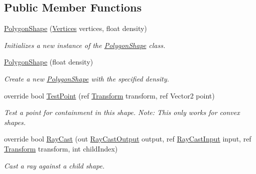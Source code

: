 \subsection*{Public Member Functions}
\begin{DoxyCompactItemize}
\item 
\hyperlink{class_farseer_physics_1_1_collision_1_1_shapes_1_1_polygon_shape_affa2db228b79a2a7d5a1f0c7f2ce8d9f}{Polygon\+Shape} (\hyperlink{class_farseer_physics_1_1_common_1_1_vertices}{Vertices} vertices, float density)
\begin{DoxyCompactList}\small\item\em Initializes a new instance of the \hyperlink{class_farseer_physics_1_1_collision_1_1_shapes_1_1_polygon_shape}{Polygon\+Shape} class. \end{DoxyCompactList}\item 
\hyperlink{class_farseer_physics_1_1_collision_1_1_shapes_1_1_polygon_shape_a1bac1381b29db8295932c02f9e76cf74}{Polygon\+Shape} (float density)
\begin{DoxyCompactList}\small\item\em Create a new \hyperlink{class_farseer_physics_1_1_collision_1_1_shapes_1_1_polygon_shape}{Polygon\+Shape} with the specified density. \end{DoxyCompactList}\item 
override bool \hyperlink{class_farseer_physics_1_1_collision_1_1_shapes_1_1_polygon_shape_ad09b14d386dc6fe310826e700b4a68db}{Test\+Point} (ref \hyperlink{struct_farseer_physics_1_1_common_1_1_transform}{Transform} transform, ref Vector2 point)
\begin{DoxyCompactList}\small\item\em Test a point for containment in this shape. Note\+: This only works for convex shapes. \end{DoxyCompactList}\item 
override bool \hyperlink{class_farseer_physics_1_1_collision_1_1_shapes_1_1_polygon_shape_a37080c01ddd2f85713dd51204badeaf6}{Ray\+Cast} (out \hyperlink{struct_farseer_physics_1_1_collision_1_1_ray_cast_output}{Ray\+Cast\+Output} output, ref \hyperlink{struct_farseer_physics_1_1_collision_1_1_ray_cast_input}{Ray\+Cast\+Input} input, ref \hyperlink{struct_farseer_physics_1_1_common_1_1_transform}{Transform} transform, int child\+Index)
\begin{DoxyCompactList}\small\item\em Cast a ray against a child shape. \end{DoxyCompactList}\item 

\end{DoxyCompactItemize}
